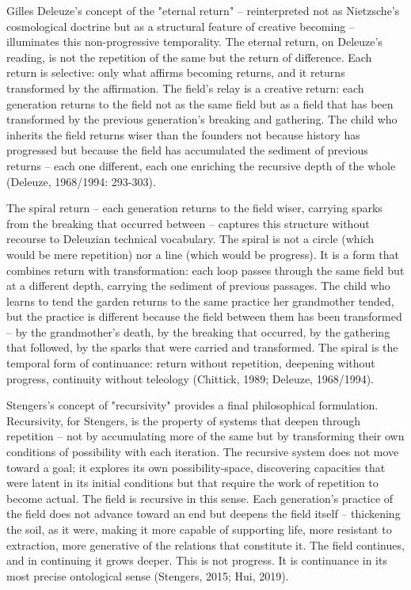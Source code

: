 Gilles Deleuze's concept of the "eternal return" -- reinterpreted not as Nietzsche's cosmological doctrine but as a structural feature of creative becoming -- illuminates this non-progressive temporality. The eternal return, on Deleuze's reading, is not the repetition of the same but the return of difference. Each return is selective: only what affirms becoming returns, and it returns transformed by the affirmation. The field's relay is a creative return: each generation returns to the field not as the same field but as a field that has been transformed by the previous generation's breaking and gathering. The child who inherits the field returns wiser than the founders not because history has progressed but because the field has accumulated the sediment of previous returns -- each one different, each one enriching the recursive depth of the whole (Deleuze, 1968/1994: 293-303).

The spiral return -- each generation returns to the field wiser, carrying sparks from the breaking that occurred between -- captures this structure without recourse to Deleuzian technical vocabulary. The spiral is not a circle (which would be mere repetition) nor a line (which would be progress). It is a form that combines return with transformation: each loop passes through the same field but at a different depth, carrying the sediment of previous passages. The child who learns to tend the garden returns to the same practice her grandmother tended, but the practice is different because the field between them has been transformed -- by the grandmother's death, by the breaking that occurred, by the gathering that followed, by the sparks that were carried and transformed. The spiral is the temporal form of continuance: return without repetition, deepening without progress, continuity without teleology (Chittick, 1989; Deleuze, 1968/1994).

Stengers's concept of "recursivity" provides a final philosophical formulation. Recursivity, for Stengers, is the property of systems that deepen through repetition -- not by accumulating more of the same but by transforming their own conditions of possibility with each iteration. The recursive system does not move toward a goal; it explores its own possibility-space, discovering capacities that were latent in its initial conditions but that require the work of repetition to become actual. The field is recursive in this sense. Each generation's practice of the field does not advance toward an end but deepens the field itself -- thickening the soil, as it were, making it more capable of supporting life, more resistant to extraction, more generative of the relations that constitute it. The field continues, and in continuing it grows deeper. This is not progress. It is continuance in its most precise ontological sense (Stengers, 2015; Hui, 2019).

